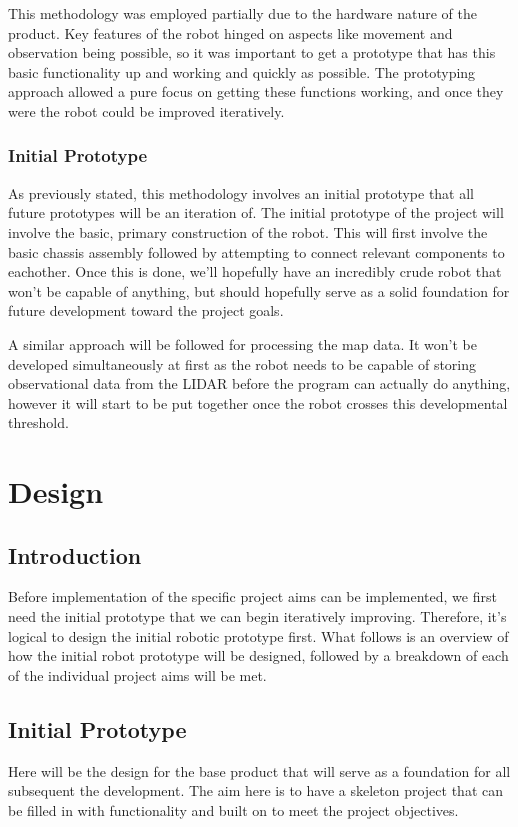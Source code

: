 	This methodology was employed partially due to the hardware nature of the product. Key features of the robot hinged on aspects like movement and observation being possible, so it was important to get a prototype that has this basic functionality up and working and quickly as possible. The prototyping approach allowed a pure focus on getting these functions working, and once they were the robot could be improved iteratively.
	
		\subsection{Initial Prototype}
		As previously stated, this methodology involves an initial prototype that all future prototypes will be an iteration of. The initial prototype of the project will involve the basic, primary construction of the robot. This will first involve the basic chassis assembly followed by attempting to connect relevant components to eachother. Once this is done, we'll hopefully have an incredibly crude robot that won't be capable of anything, but should hopefully serve as a solid foundation for future development toward the project goals.
		
		A similar approach will be followed for processing the map data. It won't be developed simultaneously at first as the robot needs to be capable of storing observational data from the LIDAR before the program can actually do anything, however it will start to be put together once the robot crosses this developmental threshold.
	
	\chapter{Design}
		\section{Introduction}
		Before implementation of the specific project aims can be implemented, we first need the initial prototype that we can begin iteratively improving. Therefore, it's logical to design the initial robotic prototype first. What follows is an overview of how the initial robot prototype will be designed, followed by a breakdown of each of the individual project aims will be met.
	
		\section{Initial Prototype}
		Here will be the design for the base product that will serve as a foundation for all subsequent the development. The aim here is to have a skeleton project that can be filled in with functionality and built on to meet the project objectives.
		
